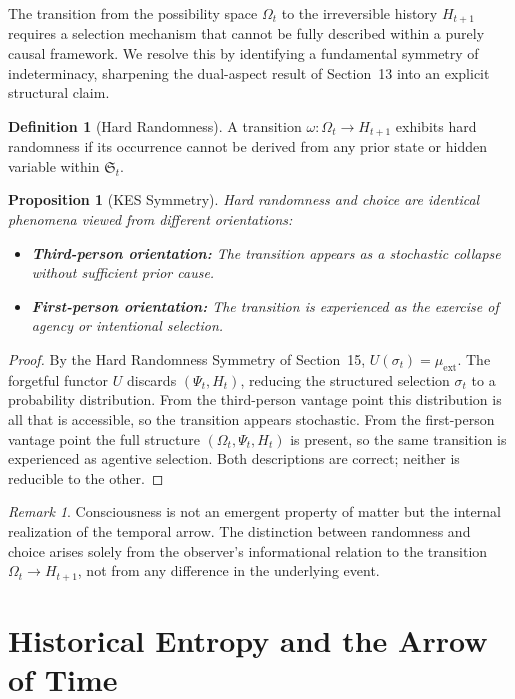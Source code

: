 \documentclass[11pt,a4paper]{article}
\newtheorem{proposition}[theorem]{Proposition}
\theoremstyle{definition}
\newtheorem{definition}[theorem]{Definition}
\theoremstyle{remark}
\newtheorem{remark}[theorem]{Remark}
\begin{document}
The transition from the possibility space $\Omega_t$ to the irreversible history $H_{t+1}$ requires a selection mechanism that cannot be fully described within a purely causal framework. We resolve this by identifying a fundamental symmetry of indeterminacy, sharpening the dual-aspect result of Section~13 into an explicit structural claim.

\begin{definition}[Hard Randomness]
A transition $\omega : \Omega_t \to H_{t+1}$ exhibits hard randomness if its occurrence cannot be derived from any prior state or hidden variable within $\mathfrak{S}_t$.
\end{definition}

\begin{proposition}[KES Symmetry]
Hard randomness and choice are identical phenomena viewed from different orientations:
\begin{itemize}
\item \textbf{Third-person orientation:} The transition appears as a stochastic collapse without sufficient prior cause.
\item \textbf{First-person orientation:} The transition is experienced as the exercise of agency or intentional selection.
\end{itemize}
\end{proposition}

\begin{proof}
By the Hard Randomness Symmetry of Section~15, $U(\sigma_t) = \mu_{\mathrm{ext}}$. The forgetful functor $U$ discards $(\Psi_t, H_t)$, reducing the structured selection $\sigma_t$ to a probability distribution. From the third-person vantage point this distribution is all that is accessible, so the transition appears stochastic. From the first-person vantage point the full structure $(\Omega_t, \Psi_t, H_t)$ is present, so the same transition is experienced as agentive selection. Both descriptions are correct; neither is reducible to the other.
\end{proof}

\begin{remark}
Consciousness is not an emergent property of matter but the internal realization of the temporal arrow. The distinction between randomness and choice arises solely from the observer's informational relation to the transition $\Omega_t \to H_{t+1}$, not from any difference in the underlying event.
\end{remark}

\section{Historical Entropy and the Arrow of Time}
\end{document}
